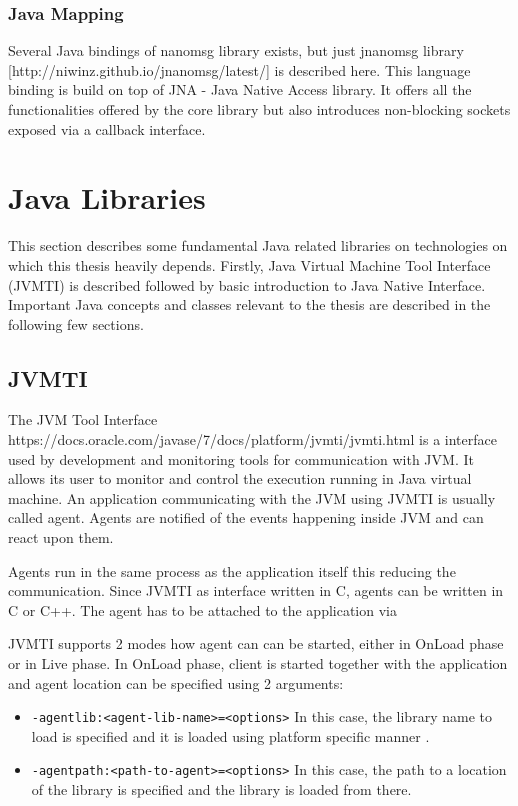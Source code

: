\subsubsection{Java Mapping}
Several Java bindings of nanomsg library exists, but just jnanomsg library [http://niwinz.github.io/jnanomsg/latest/] is described here. This language binding is build on top of JNA - Java Native Access library. It offers all the functionalities offered by the core library but also introduces non-blocking sockets exposed via a callback interface.
\section{Java Libraries}
This section describes some fundamental Java related libraries on technologies on which this thesis heavily depends. Firstly, Java Virtual Machine Tool Interface (JVMTI) is described followed by basic introduction to Java Native Interface. Important Java concepts and classes relevant to the thesis are described in the following few sections.
\subsection{JVMTI}
The JVM Tool Interface https://docs.oracle.com/javase/7/docs/platform/jvmti/jvmti.html is a interface used by development and monitoring tools for communication with JVM. It allows its user to monitor and control the execution running in Java virtual machine. An application communicating with the JVM using JVMTI is usually called agent. Agents are notified of the events happening inside JVM and can react upon them.

Agents run in the same process as the application itself this reducing the communication. Since JVMTI as interface written in C, agents can be written in C or C++. The agent has to be attached to the application via 

JVMTI supports 2 modes how agent can can be started, either in OnLoad phase or in Live phase. In OnLoad phase, client is started together with the application and agent location can be specified using 2 arguments:
\begin{itemize}
	\item \texttt{-agentlib:<agent-lib-name>=<options>} \newline
	In this case, the library name to load is specified and it is loaded using platform specific manner .
	\item \texttt{-agentpath:<path-to-agent>=<options>} \newline
	In this case, the path to a location of the library is specified and the library is loaded from there.
\end{itemize}

